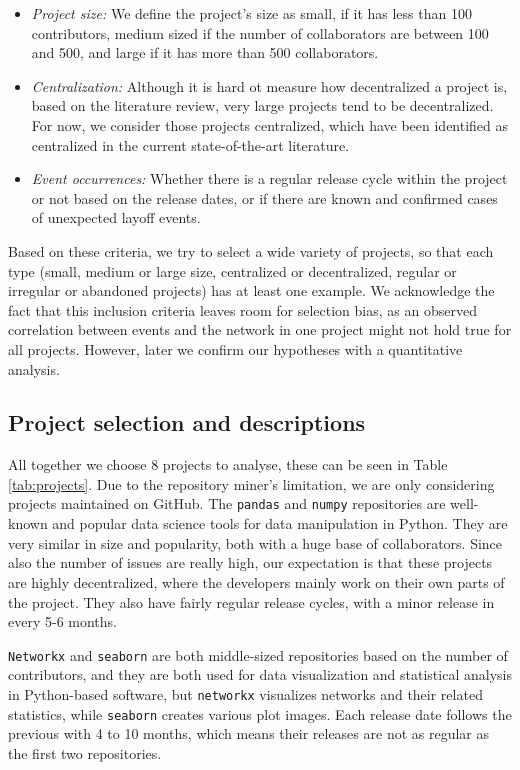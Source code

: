\begin{itemize}
    \item \textit{Project size:} We define the project's size as small, if it has less than 100 contributors, medium sized if the number of collaborators are between 100 and 500, and large if it has more than 500 collaborators.
    \item \textit{Centralization:} Although it is hard ot measure how decentralized a project is, based on the literature review, very large projects tend to be decentralized. For now, we consider those projects centralized, which have been identified as centralized in the current state-of-the-art literature. 
    \item \textit{Event occurrences:} Whether there is a regular release cycle within the project or not based on the release dates, or if there are known and confirmed cases of unexpected layoff events.
\end{itemize}

Based on these criteria, we try to select a wide variety of projects, so that each type (small, medium or large size, centralized or decentralized, regular or irregular or abandoned projects) has at least one example. We acknowledge the fact that this inclusion criteria leaves room for selection bias, as an observed correlation between events and the network in one project might not hold true for all projects. However, later we confirm our hypotheses with a quantitative analysis.

\subsection{Project selection and descriptions}

All together we choose 8 projects to analyse, these can be seen in Table \ref{tab:projects}. Due to the repository miner's limitation, we are only considering projects maintained on GitHub. The \texttt{pandas} and \texttt{numpy} repositories are well-known and popular data science tools for data manipulation in Python. They are very similar in size and popularity, both with a huge base of collaborators. Since also the number of issues are really high, our expectation is that these projects are highly decentralized, where the developers mainly work on their own parts of the project. They also have fairly regular release cycles, with a minor release in every 5-6 months.

\texttt{Networkx} and \texttt{seaborn} are both middle-sized repositories based on the number of contributors, and they are both used for data visualization and statistical analysis in Python-based software, but \texttt{networkx} visualizes networks and their related statistics, while \texttt{seaborn} creates various plot images. Each release date follows the previous with 4 to 10 months, which means their releases are not as regular as the first two repositories.

